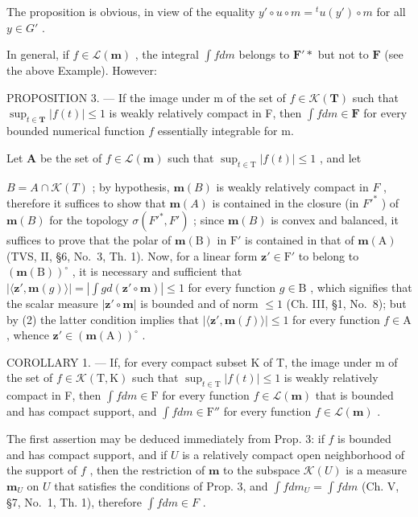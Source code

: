 The proposition is obvious, in view of the equality \(y'\circ u\circ m = {}^{t}u(y')\circ m\) for all \(y \in G'\) .

In general, if \(f \in \mathcal{L}(\mathbf{m})\) , the integral \(\int f dm\) belongs to \(\mathbf{F}'*\) but not to \(\mathbf{F}\) (see the above Example). However:

PROPOSITION 3. --- If the image under m of the set of \(f \in \mathcal{K}(\mathbf{T})\) such that \(\sup_{t \in \mathbf{T}} |f(t)| \leqslant 1\) is weakly relatively compact in F, then \(\int f dm \in \mathbf{F}\) for every bounded numerical function \(f\) essentially integrable for m.

Let \(\mathbf{A}\) be the set of \(f\in \mathcal{L}(\mathbf{m})\) such that \(\sup_{t\in \mathrm{T}}|f(t)|\leqslant 1\) , and let

\(B = A \cap \mathcal{K}(T)\) ; by hypothesis, \(\mathbf{m}(B)\) is weakly relatively compact in \(F\) , therefore it suffices to show that \(\mathbf{m}(A)\) is contained in the closure (in \(F'^*\) ) of \(\mathbf{m}(B)\) for the topology \(\sigma(F'^*, F')\) ; since \(\mathbf{m}(B)\) is convex and balanced, it suffices to prove that the polar of \(\mathbf{m}(\mathrm{B})\) in \(\mathrm{F}'\) is contained in that of \(\mathbf{m}(\mathrm{A})\) (TVS, II, §6, No.~3, Th. 1). Now, for a linear form \(\mathbf{z}' \in \mathrm{F}'\) to belong to \((\mathbf{m}(\mathrm{B}))^\circ\) , it is necessary and sufficient that \(|\langle \mathbf{z}', \mathbf{m}(g) \rangle| = |\int g d(\mathbf{z}' \circ \mathbf{m})| \leqslant 1\) for every function \(g \in \mathrm{B}\) , which signifies that the scalar measure \(|\mathbf{z}' \circ \mathbf{m}|\) is bounded and of norm \(\leqslant 1\) (Ch. III, §1, No.~8); but by (2) the latter condition implies that \(|\langle \mathbf{z}', \mathbf{m}(f) \rangle| \leqslant 1\) for every function \(f \in \mathrm{A}\) , whence \(\mathbf{z}' \in (\mathbf{m}(\mathrm{A}))^\circ\) .

COROLLARY 1. --- If, for every compact subset K of T, the image under m of the set of \(f \in \mathcal{K}(\mathrm{T},\mathrm{K})\) such that \(\sup_{t \in \mathrm{T}} |f(t)| \leqslant 1\) is weakly relatively compact in F, then \(\int f dm \in \mathrm{F}\) for every function \(f \in \mathcal{L}(\mathbf{m})\) that is bounded and has compact support, and \(\int f dm \in \mathrm{F}''\) for every function \(f \in \mathcal{L}(\mathbf{m})\) .

The first assertion may be deduced immediately from Prop. 3: if \(f\) is bounded and has compact support, and if \(U\) is a relatively compact open neighborhood of the support of \(f\) , then the restriction of \(\mathbf{m}\) to the subspace \(\mathcal{K}(U)\) is a measure \(\mathbf{m}_U\) on \(U\) that satisfies the conditions of Prop. 3, and \(\int f dm_U = \int f dm\) (Ch. V, §7, No.~1, Th. 1), therefore \(\int f dm \in F\) .

